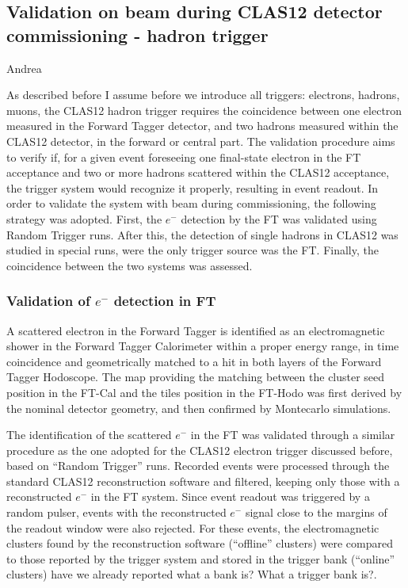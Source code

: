 \subsection{Validation on beam during CLAS12 detector commissioning -  hadron trigger} Andrea

As described before {\color{Red} I assume before we introduce all triggers: electrons, hadrons, muons}, the CLAS12 hadron trigger requires the coincidence between one electron measured in the Forward Tagger detector, and two hadrons measured within the CLAS12 detector, in the forward or central part. The validation procedure aims to verify if, for a given event foreseeing one final-state electron in the FT acceptance and two or more hadrons scattered within the CLAS12 acceptance, the trigger system would recognize it properly, resulting in event readout. In order to validate the system with beam during commissioning, the following strategy was adopted. First, the $e^-$ detection by the FT was validated using Random Trigger runs. After this, the detection of single hadrons in CLAS12 was studied in special runs, were the only trigger source was the FT. Finally, the coincidence between the two systems was assessed.

\subsubsection{Validation of $e^-$ detection in FT}

A scattered electron in the Forward Tagger is identified as an electromagnetic shower in the Forward Tagger Calorimeter within a proper energy range, in time coincidence and geometrically matched to a hit in both layers of the Forward Tagger Hodoscope. The map providing the matching between the cluster seed position in the FT-Cal and the tiles position in the FT-Hodo was first derived by the nominal detector geometry, and then confirmed by Montecarlo simulations.

The identification of the scattered $e^-$ in the FT was validated through a similar procedure as the one adopted for the CLAS12 electron trigger discussed before, based on ``Random Trigger'' runs. Recorded events were processed through the standard CLAS12 reconstruction software and filtered, keeping only those with a reconstructed $e^-$ in the FT system. Since event readout was triggered by a random pulser, events with the reconstructed $e^-$ signal close to the margins of the readout window were also rejected.
For these events, the electromagnetic clusters found by the reconstruction software (``offline'' clusters) were compared to those reported by the trigger system and stored in the trigger bank (``online'' clusters) {\color{red} have we already reported what a bank is? What a trigger bank is?}. 

